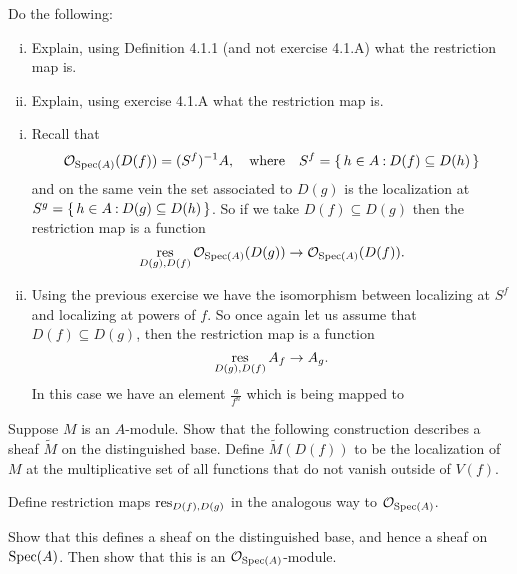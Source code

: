 \documentclass[12pt]{memoir}
\begin{document}
    \begin{Ej}[Restrictions]
        Do the following:
        \begin{enumerate}[i)]
            \itemsep=-0.4em
            \item Explain, using Definition 4.1.1 (and not exercise 4.1.A) what the restriction map is.
            \item Explain, using exercise 4.1.A what the restriction map is.
        \end{enumerate}
    \end{Ej}
    
    \begin{ptcbr}
    \begin{enumerate}[i)]
        \itemsep=-0.4em
        \item Recall that 
    $$\mathcal{O}_{\operatorname{Spec}(A)}(D(f))=(S^f)^{-1}A,\quad\text{where}\quad S^f=\{\,h\in A\mathbin{:} D(f)\subseteq D(h)\,\}$$
    and on the same vein the set associated to $D(g)$ is the localization at $S^g=\{\,h\in A\mathbin{:} D(g)\subseteq D(h)\,\}$. So if we take $D(f)\subseteq D(g)$ then the restriction map is a function 
    $$\operatorname*{res}_{D(g),D(f)}\mathcal{O}_{\operatorname{Spec}(A)}(D(g))\to\mathcal{O}_{\operatorname{Spec}(A)}(D(f)).$$
    \item Using the previous exercise we have the isomorphism between localizing at $S^f$ and localizing at powers of $f$. So once again let us assume that $D(f)\subseteq D(g)$, then the restriction map is a function 
    $$\operatorname*{res}_{D(g),D(f)}A_f\to A_g.$$
    In this case we have an element $\frac{a}{f^n}$ which is being mapped to 

    \end{enumerate}
    \end{ptcbr}

    \begin{Ej}[4.1.D Vakil]
        Suppose $M$ is an $A$-module. Show
that the following construction describes a sheaf $\widetilde{M}$ on the distinguished base. Define $\widetilde{M}(D(f))$ to be the localization of $M$ at the multiplicative set of all functions that do not vanish outside of $V(f)$.\par
 Define restriction maps $\operatorname*{res}_{D(f),D(g)}$ in the analogous way to $\mathcal{O}_{\operatorname{Spec}(A)}$.\par
  Show that this defines a sheaf on the distinguished base, and hence a sheaf on $\operatorname{Spec}(A)$. Then show that this is an $\mathcal{O}_{\operatorname{Spec}(A)}$-module.
    \end{Ej}
    
    \begin{ptcbr}
    
    \end{ptcbr}
\end{document}
